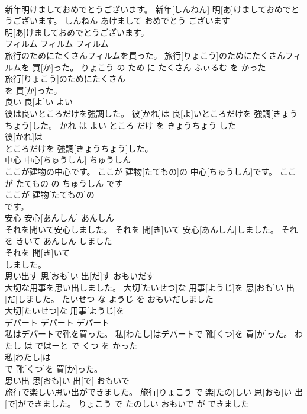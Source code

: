 \documentclass[8pt]{extreport}
\begin{document}
\begin{CJK}{UTF8}{min}
\\	新年明けましておめでとうございます。	新年[しんねん] 明[あ]けましておめでとうございます。	しんねん あけまして おめでとう ございます	
\\	明[あ]けましておめでとうございます。			
\\	フィルム	フィルム	フィルム	
\\	旅行のためにたくさんフィルムを買った。	旅行[りょこう]のためにたくさんフィルムを 買[か]った。	りょこう の ため に たくさん ふぃるむ を かった	
\\	旅行[りょこう]のためにたくさん
\\	を 買[か]った。			
\\	良い	良[よ]い	よい	
\\	彼は良いところだけを強調した。	彼[かれ]は 良[よ]いところだけを 強調[きょうちょう]した。	かれ は よい ところ だけ を きょうちょう した	
\\	彼[かれ]は
\\	ところだけを 強調[きょうちょう]した。			
\\	中心	中心[ちゅうしん]	ちゅうしん	
\\	ここが建物の中心です。	ここが 建物[たてもの]の 中心[ちゅうしん]です。	ここ が たてもの の ちゅうしん です	
\\	ここが 建物[たてもの]の
\\	です。			
\\	安心	安心[あんしん]	あんしん	
\\	それを聞いて安心しました。	それを 聞[き]いて 安心[あんしん]しました。	それ を きいて あんしん しました	
\\	それを 聞[き]いて
\\	しました。			
\\	思い出す	思[おも]い 出[だ]す	おもいだす	
\\	大切な用事を思い出しました。	大切[たいせつ]な 用事[ようじ]を 思[おも]い 出[だ]しました。	たいせつ な ようじ を おもいだしました	
\\	大切[たいせつ]な 用事[ようじ]を
\\	デパート	デパート	デパート	
\\	私はデパートで靴を買った。	私[わたし]はデパートで 靴[くつ]を 買[か]った。	わたし は でぱーと で くつ を かった	
\\	私[わたし]は
\\	で 靴[くつ]を 買[か]った。			
\\	思い出	思[おも]い 出[で]	おもいで	
\\	旅行で楽しい思い出ができました。	旅行[りょこう]で 楽[たの]しい 思[おも]い 出[で]ができました。	りょこう で たのしい おもいで が できました	

\end{CJK}
\end{document}
